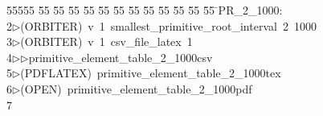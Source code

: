 %
%
\begin{tabbing}
55555 \= 55 \= 55 \= 55 \= 55 \= 55 \= 55 \= 55 \= 55 \= 55 \= 55 \= 55 \= 55 \= \>PR\_2\_1000:\\[0pt]
2\>$\triangleright$\>(ORBITER)\ v\ 1\ smallest\_primitive\_root\_interval\ 2\ 1000\\[0pt]
3\>$\triangleright$\>(ORBITER)\ v\ 1\ csv\_file\_latex\ 1\ \\[0pt]
4\>$\triangleright$\>$\triangleright$\>primitive\_element\_table\_2\_1000csv\\[0pt]
5\>$\triangleright$\>(PDFLATEX)\ primitive\_element\_table\_2\_1000tex\\[0pt]
6\>$\triangleright$\>(OPEN)\ primitive\_element\_table\_2\_1000pdf\\[0pt]
7\>\end{tabbing}
